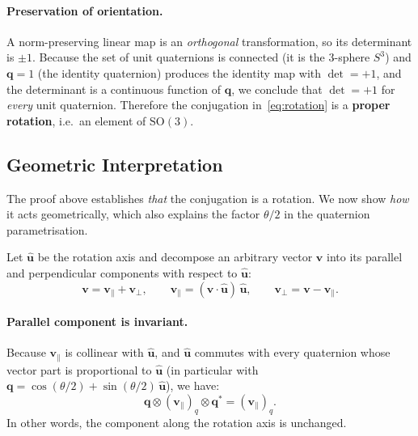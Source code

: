 \paragraph{Preservation of orientation.}
A norm-preserving linear map is an \emph{orthogonal} transformation, so
its determinant is $\pm 1$.  Because the set of unit quaternions is
connected (it is the 3-sphere $S^3$) and $\mathbf{q}=1$ (the identity
quaternion) produces the identity map with $\det=+1$, and the determinant
is a continuous function of $\mathbf{q}$, we conclude that
$\det=+1$ for \emph{every} unit quaternion.  Therefore the conjugation
in~\eqref{eq:rotation} is a \textbf{proper rotation}, i.e.\ an element
of $\mathrm{SO}(3)$.

\subsection{Geometric Interpretation}
\label{sec:quat:geometry}

The proof above establishes \emph{that} the conjugation is a rotation.
We now show \emph{how} it acts geometrically, which also explains the
factor $\theta/2$ in the quaternion parametrisation.

Let $\hat{\mathbf{u}}$ be the rotation axis and decompose an arbitrary
vector $\mathbf{v}$ into its parallel and perpendicular components with
respect to $\hat{\mathbf{u}}$:
\begin{equation}
  \mathbf{v} = \mathbf{v}_\parallel + \mathbf{v}_\perp,
  \qquad
  \mathbf{v}_\parallel = (\mathbf{v}\cdot\hat{\mathbf{u}})\,\hat{\mathbf{u}},
  \qquad
  \mathbf{v}_\perp = \mathbf{v} - \mathbf{v}_\parallel.
  \label{eq:decomposition}
\end{equation}

\paragraph{Parallel component is invariant.}
Because $\mathbf{v}_\parallel$ is collinear with $\hat{\mathbf{u}}$, and
$\hat{\mathbf{u}}$ commutes with every quaternion whose vector part is
proportional to $\hat{\mathbf{u}}$ (in particular with
$\mathbf{q}=\cos(\theta/2)+\sin(\theta/2)\,\hat{\mathbf{u}}$), we have:
\begin{equation}
  \mathbf{q}\otimes(\mathbf{v}_\parallel)_q\otimes\mathbf{q}^*
  = (\mathbf{v}_\parallel)_q.
  \label{eq:parallel_invariant}
\end{equation}
In other words, the component along the rotation axis is unchanged.

